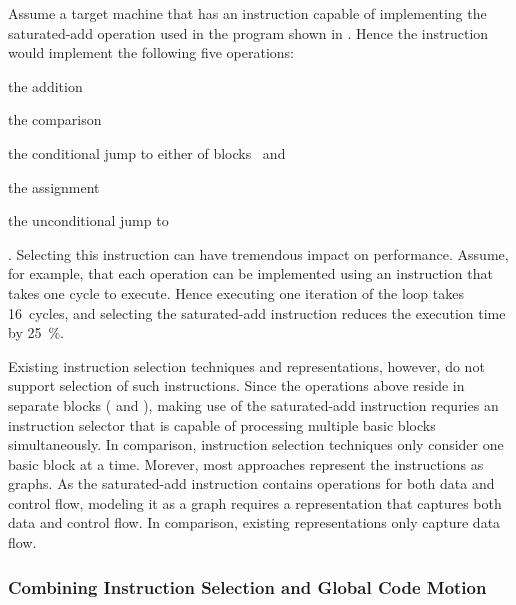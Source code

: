 Assume a \gls{target machine} that has an instruction capable of implementing
the saturated-add \gls{operation} used in the \gls{program} shown in
.
%
Hence the \gls{instruction} would implement the following five operations:%
%
\begin{inlinelist}[itemjoin={, }, itemjoin*={, and}]
  \item the  addition
  \item the  comparison
  \item the conditional jump to either of blocks~ and~
  \item the  assignment
  \item the unconditional jump to~
\end{inlinelist}.
%
Selecting this \gls{instruction} can have tremendous impact on performance.
%
Assume, for example, that each \gls{operation} can be implemented using an
\gls{instruction} that takes one cycle to execute. Hence executing one iteration
of the loop takes \num{16}~cycles, and selecting the saturated-add
\gls{instruction} reduces the execution time by \SI{25}{\percent}.

Existing \gls{instruction selection} techniques and representations, however, do
not support selection of such \glspl{instruction}.
%
Since the \glspl{operation} above reside in separate \glspl{block} (
and ), making use of the saturated-add \gls{instruction} requries an
\gls{instruction selector} that is capable of processing multiple \glspl{basic
  block} simultaneously.
%
In comparison,  \gls{instruction selection}
techniques only consider one \gls{basic block} at a time.
%
Morever, most approaches represent the \glspl{instruction} as \glspl{graph}.
%
As the saturated-add \gls{instruction} contains \glspl{operation} for both data
and control flow, modeling it as a \gls{graph} requires a representation that
captures both data and control flow.
%
In comparison, existing representations only capture data flow.



\subsubsection{Combining Instruction Selection and Global Code Motion}

